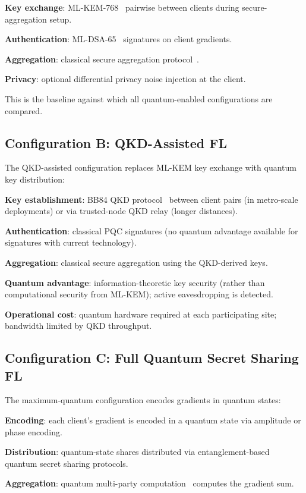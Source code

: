 \documentclass[sigconf,nonacm]{acmart}
\begin{document}
\textbf{Key exchange}: ML-KEM-768~\cite{nist2024fips203} pairwise
between clients during secure-aggregation setup.

\textbf{Authentication}: ML-DSA-65~\cite{nist2024fips204}
signatures on client gradients.

\textbf{Aggregation}: classical secure aggregation
protocol~\cite{bonawitz2017secagg}.

\textbf{Privacy}: optional differential privacy noise injection
at the client.

This is the baseline against which all quantum-enabled
configurations are compared.

\subsection{Configuration B: QKD-Assisted FL}

The QKD-assisted configuration replaces ML-KEM key exchange with
quantum key distribution:

\textbf{Key establishment}: BB84 QKD protocol~\cite{bennett1984bb84}
between client pairs (in metro-scale deployments) or via
trusted-node QKD relay (longer distances).

\textbf{Authentication}: classical PQC signatures (no quantum
advantage available for signatures with current technology).

\textbf{Aggregation}: classical secure aggregation using the
QKD-derived keys.

\textbf{Quantum advantage}: information-theoretic key security
(rather than computational security from ML-KEM); active
eavesdropping is detected.

\textbf{Operational cost}: quantum hardware required at each
participating site; bandwidth limited by QKD throughput.

\subsection{Configuration C: Full Quantum Secret Sharing FL}

The maximum-quantum configuration encodes gradients in quantum
states:

\textbf{Encoding}: each client's gradient is encoded in a quantum
state via amplitude or phase encoding.

\textbf{Distribution}: quantum-state shares distributed via
entanglement-based quantum secret sharing protocols.

\textbf{Aggregation}: quantum multi-party
computation~\cite{crepeau2024qmpc} computes the gradient sum.
\end{document}
